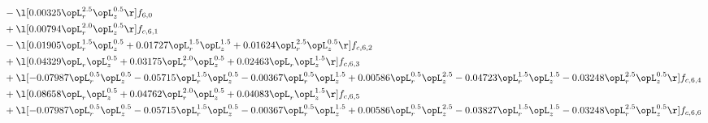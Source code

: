 \begin{alignat}{2}
& - \l[  0.00325 \opL_r^{2.5} \opL_z^{0.5}  \r] f_{6,0} \nonumber \\ 
& + \l[  0.00794 \opL_r^{2.0} \opL_z^{0.5}  \r] f_{c,6,1} \nonumber \\ 
& - \l[  0.01905 \opL_r^{1.5} \opL_z^{0.5} +  0.01727 \opL_r^{1.5} \opL_z^{1.5} +  0.01624 \opL_r^{2.5} \opL_z^{0.5}  \r] f_{c,6,2} \nonumber \\ 
& + \l[  0.04329 \opL_r \opL_z^{0.5} +  0.03175 \opL_r^{2.0} \opL_z^{0.5} +  0.02463 \opL_r \opL_z^{1.5}  \r] f_{c,6,3} \nonumber \\ 
& + \l[  -0.07987 \opL_r^{0.5} \opL_z^{0.5}   -0.05715 \opL_r^{1.5} \opL_z^{0.5}   -0.00367 \opL_r^{0.5} \opL_z^{1.5} +  0.00586 \opL_r^{0.5} \opL_z^{2.5}   -0.04723 \opL_r^{1.5} \opL_z^{1.5}   -0.03248 \opL_r^{2.5} \opL_z^{0.5}  \r] f_{c,6,4} \nonumber \\ 
& + \l[  0.08658 \opL_r \opL_z^{0.5} +  0.04762 \opL_r^{2.0} \opL_z^{0.5} +  0.04083 \opL_r \opL_z^{1.5}  \r] f_{c,6,5} \nonumber \\ 
& + \l[  -0.07987 \opL_r^{0.5} \opL_z^{0.5}   -0.05715 \opL_r^{1.5} \opL_z^{0.5}   -0.00367 \opL_r^{0.5} \opL_z^{1.5} +  0.00586 \opL_r^{0.5} \opL_z^{2.5}   -0.03827 \opL_r^{1.5} \opL_z^{1.5}   -0.03248 \opL_r^{2.5} \opL_z^{0.5}  \r] f_{c,6,6} \nonumber \\ 
\end{alignat} 


